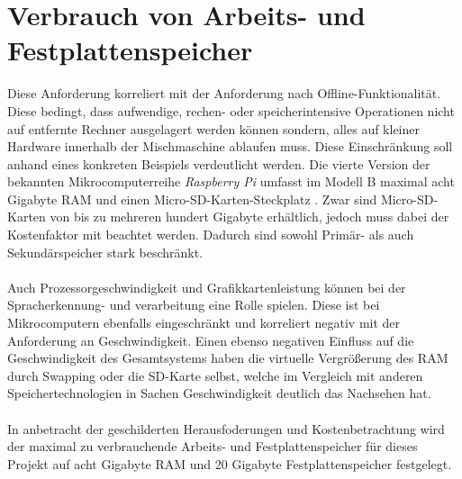 \section{Verbrauch von Arbeits- und Festplattenspeicher}
Diese Anforderung korreliert mit der Anforderung nach Offline-Funktionalität. Diese bedingt, dass aufwendige, rechen- oder speicherintensive Operationen nicht auf entfernte Rechner ausgelagert werden können sondern, alles auf \glqq{}kleiner\grqq{} Hardware innerhalb der Mischmaschine ablaufen muss. Diese Einschränkung soll anhand eines konkreten Beispiels verdeutlicht werden. Die vierte Version der bekannten Mikrocomputerreihe \textit{Raspberry Pi} umfasst im Modell B maximal acht Gigabyte \ac{RAM} und einen Micro-SD-Karten-Steckplatz \cite{ltd_raspberry_nodate}. Zwar sind Micro-SD-Karten von bis zu mehreren hundert Gigabyte erhältlich, jedoch muss dabei der Kostenfaktor mit beachtet werden. Dadurch sind sowohl Primär- als auch Sekundärspeicher stark beschränkt.\\\\
Auch Prozessorgeschwindigkeit und Grafikkartenleistung können bei der Spracherkennung- und verarbeitung eine Rolle spielen. Diese ist bei Mikrocomputern ebenfalls eingeschränkt und korreliert negativ mit der Anforderung an Geschwindigkeit. Einen ebenso negativen Einfluss auf die Geschwindigkeit des Gesamtsystems haben die virtuelle Vergrößerung des \ac{RAM} durch Swapping oder die SD-Karte selbst, welche im Vergleich mit anderen Speichertechnologien in Sachen Geschwindigkeit deutlich das Nachsehen hat.\\\\
In anbetracht der geschilderten Herausfoderungen und Kostenbetrachtung wird der maximal zu verbrauchende Arbeits- und Festplattenspeicher für dieses Projekt auf acht Gigabyte \ac{RAM} und 20 Gigabyte Festplattenspeicher festgelegt.